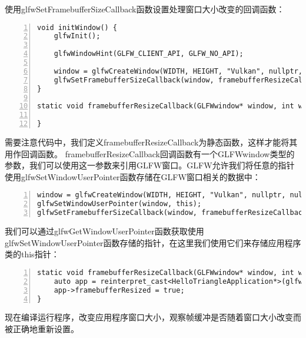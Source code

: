 \documentclass{ctexart}
\begin{document}
使用glfwSetFramebufferSizeCallback函数设置处理窗口大小改变的回调函数：

\begin{lstlisting}[language={[ANSI]C},keywordstyle=\color{blue!70},commentstyle=\color{red!50!green!50!blue!50},frame=shadowbox, rulesepcolor=\color{red!20!green!20!blue!20},basicstyle=\small,numbers=left, numberstyle=\tiny,breaklines=true]
void initWindow() {
	glfwInit();

	glfwWindowHint(GLFW_CLIENT_API, GLFW_NO_API);

	window = glfwCreateWindow(WIDTH, HEIGHT, "Vulkan", nullptr, nullptr);
	glfwSetFramebufferSizeCallback(window, framebufferResizeCallback);
}

static void framebufferResizeCallback(GLFWwindow* window, int width, int height) {

}
\end{lstlisting}

需要注意代码中，我们定义framebufferResizeCallback为静态函数，这样才能将其用作回调函数。
framebufferResizeCallback回调函数有一个GLFWwindow类型的参数，我们可以使用这一参数来引用GLFW窗口。GLFW允许我们将任意的指针使用glfwSetWindowUserPointer函数存储在GLFW窗口相关的数据中：

\begin{lstlisting}[language={[ANSI]C},keywordstyle=\color{blue!70},commentstyle=\color{red!50!green!50!blue!50},frame=shadowbox, rulesepcolor=\color{red!20!green!20!blue!20},basicstyle=\small,numbers=left, numberstyle=\tiny,breaklines=true]
window = glfwCreateWindow(WIDTH, HEIGHT, "Vulkan", nullptr, nullptr);
glfwSetWindowUserPointer(window, this);
glfwSetFramebufferSizeCallback(window, framebufferResizeCallback);
\end{lstlisting}

我们可以通过glfwGetWindowUserPointer函数获取使用glfwSetWindowUserPointer函数存储的指针，在这里我们使用它们来存储应用程序类的this指针：

\begin{lstlisting}[language={[ANSI]C},keywordstyle=\color{blue!70},commentstyle=\color{red!50!green!50!blue!50},frame=shadowbox, rulesepcolor=\color{red!20!green!20!blue!20},basicstyle=\small,numbers=left, numberstyle=\tiny,breaklines=true]
static void framebufferResizeCallback(GLFWwindow* window, int width, int height) {
	auto app = reinterpret_cast<HelloTriangleApplication*>(glfwGetWindowUserPointer(window));
	app->framebufferResized = true;
}
\end{lstlisting}

现在编译运行程序，改变应用程序窗口大小，观察帧缓冲是否随着窗口大小改变而被正确地重新设置。
\end{document}
